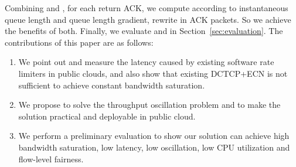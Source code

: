 Combining \nameone and \nametwo, for each return ACK, we compute \cwnd according to instantaneous queue length and queue length gradient, rewrite \rwnd in ACK packets. So we achieve the benefits of both. Finally, we evaluate \nameone and \nametwo in Section~\ref{sec:evaluation}. 
The contributions of this paper are as follows:
\begin{enumerate}
\item We point out and measure the latency caused by existing software rate limiters in public clouds, and also show that existing DCTCP+ECN is not sufficient to achieve constant bandwidth saturation.

\item We propose \nameone to solve the throughput oscillation problem and \nametwo to make the solution practical and deployable in public cloud.

\item We perform a preliminary evaluation to show our solution can achieve high bandwidth saturation, low latency, low oscillation, low CPU utilization and flow-level fairness.

\iffalse
\item We measure the performance (latency and packet loss) of software rate limiters. We show that software rate limiters can greatly increase end-to-end latency for multi-tenant cloud networks. 
We also show that simply extending ECN in software rate limiter queues and enabling DCTCP on the end-points (i.e., VMs or Container) give sub-optimal performance. 

\item We propose two techniques (\nameone and \nametwo) to enable high throughput, low oscillation, low latency and generic software rate limiters for multi-tenant cloud networks.

\item We evaluate the performance of \nameone and \nametwo. The experiment results demonstrate that the proposed solutions achieve our design goals.
\fi
\end{enumerate}

